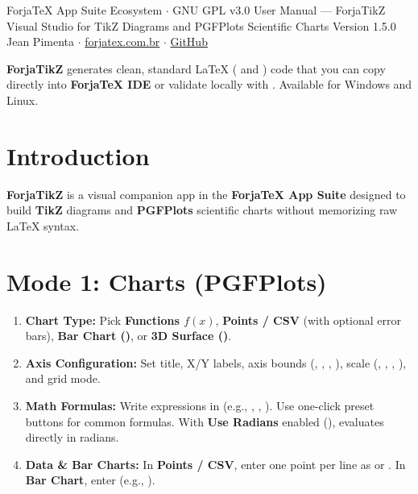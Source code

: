 \documentclass[11pt,a4paper]{article}
\begin{document}
  {ForjaTeX App Suite Ecosystem $\cdot$ GNU GPL v3.0}
  {User Manual --- ForjaTikZ}
  {Visual Studio for TikZ Diagrams and PGFPlots Scientific Charts}
  {Version 1.5.0}
  {Jean Pimenta $\cdot$ \href{https://forjatex.com.br}{\color{fjsky}forjatex.com.br} $\cdot$ \href{https://github.com/jeanjpimenta/forjatex-suite}{\color{fjsky}GitHub}}


\begin{fjcallout}
\textbf{ForjaTikZ} generates clean, standard \LaTeX{} ( and ) code that you can copy directly into \textbf{ForjaTeX IDE} or validate locally with . Available for Windows and Linux.
\end{fjcallout}

\section{Introduction}
\textbf{ForjaTikZ} is a visual companion app in the \textbf{ForjaTeX App Suite} designed to build \textbf{TikZ} diagrams and \textbf{PGFPlots} scientific charts without memorizing raw \LaTeX{} syntax.

\section{Mode 1: Charts (PGFPlots)}
\begin{enumerate}
  \item \textbf{Chart Type:} Pick \textbf{Functions $f(x)$}, \textbf{Points / CSV} (with optional error bars), \textbf{Bar Chart ()}, or \textbf{3D Surface ()}.
  \item \textbf{Axis Configuration:} Set title, X/Y labels, axis bounds (, , , ), scale (, , , ), and grid mode.
  \item \textbf{Math Formulas:} Write expressions in  (e.g., , , ). Use one-click preset buttons for common formulas. With \textbf{Use Radians} enabled (),  evaluates directly in radians.
  \item \textbf{Data \& Bar Charts:} In \textbf{Points / CSV}, enter one point per line as  or . In \textbf{Bar Chart}, enter  (e.g., ).
\end{enumerate}
\end{document}
